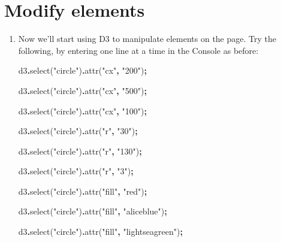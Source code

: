 \documentclass[
  openany]{book}
\newenvironment{Shaded}{\begin{snugshade}}{\end{snugshade}}
\newcommand{\FunctionTok}[1]{\textcolor[rgb]{0.00,0.00,0.00}{#1}}
\newcommand{\NormalTok}[1]{#1}
\newcommand{\OperatorTok}[1]{\textcolor[rgb]{0.81,0.36,0.00}{\textbf{#1}}}
\newcommand{\StringTok}[1]{\textcolor[rgb]{0.31,0.60,0.02}{#1}}
\begin{document}
\hypertarget{modify-elements}{%
\section{\texorpdfstring{Modify elements }{Modify elements }}\label{modify-elements}}

\begin{enumerate}
\def\labelenumi{\arabic{enumi}.}
\item
  Now we'll start using D3 to manipulate elements on the page. Try the following, by entering one line at a time in the Console as before:

\begin{Shaded}
\begin{Highlighting}[]
\NormalTok{d3}\OperatorTok{.}\FunctionTok{select}\NormalTok{(}\StringTok{"circle"}\NormalTok{)}\OperatorTok{.}\FunctionTok{attr}\NormalTok{(}\StringTok{"cx"}\OperatorTok{,} \StringTok{"200"}\NormalTok{)}\OperatorTok{;}

\NormalTok{d3}\OperatorTok{.}\FunctionTok{select}\NormalTok{(}\StringTok{"circle"}\NormalTok{)}\OperatorTok{.}\FunctionTok{attr}\NormalTok{(}\StringTok{"cx"}\OperatorTok{,} \StringTok{"500"}\NormalTok{)}\OperatorTok{;}

\NormalTok{d3}\OperatorTok{.}\FunctionTok{select}\NormalTok{(}\StringTok{"circle"}\NormalTok{)}\OperatorTok{.}\FunctionTok{attr}\NormalTok{(}\StringTok{"cx"}\OperatorTok{,} \StringTok{"100"}\NormalTok{)}\OperatorTok{;}

\NormalTok{d3}\OperatorTok{.}\FunctionTok{select}\NormalTok{(}\StringTok{"circle"}\NormalTok{)}\OperatorTok{.}\FunctionTok{attr}\NormalTok{(}\StringTok{"r"}\OperatorTok{,} \StringTok{"30"}\NormalTok{)}\OperatorTok{;}

\NormalTok{d3}\OperatorTok{.}\FunctionTok{select}\NormalTok{(}\StringTok{"circle"}\NormalTok{)}\OperatorTok{.}\FunctionTok{attr}\NormalTok{(}\StringTok{"r"}\OperatorTok{,} \StringTok{"130"}\NormalTok{)}\OperatorTok{;}

\NormalTok{d3}\OperatorTok{.}\FunctionTok{select}\NormalTok{(}\StringTok{"circle"}\NormalTok{)}\OperatorTok{.}\FunctionTok{attr}\NormalTok{(}\StringTok{"r"}\OperatorTok{,} \StringTok{"3"}\NormalTok{)}\OperatorTok{;}

\NormalTok{d3}\OperatorTok{.}\FunctionTok{select}\NormalTok{(}\StringTok{"circle"}\NormalTok{)}\OperatorTok{.}\FunctionTok{attr}\NormalTok{(}\StringTok{"fill"}\OperatorTok{,} \StringTok{"red"}\NormalTok{)}\OperatorTok{;}

\NormalTok{d3}\OperatorTok{.}\FunctionTok{select}\NormalTok{(}\StringTok{"circle"}\NormalTok{)}\OperatorTok{.}\FunctionTok{attr}\NormalTok{(}\StringTok{"fill"}\OperatorTok{,} \StringTok{"aliceblue"}\NormalTok{)}\OperatorTok{;}

\NormalTok{d3}\OperatorTok{.}\FunctionTok{select}\NormalTok{(}\StringTok{"circle"}\NormalTok{)}\OperatorTok{.}\FunctionTok{attr}\NormalTok{(}\StringTok{"fill"}\OperatorTok{,} \StringTok{"lightseagreen"}\NormalTok{)}\OperatorTok{;}
\end{Highlighting}
\end{Shaded}
\end{enumerate}
\end{document}
